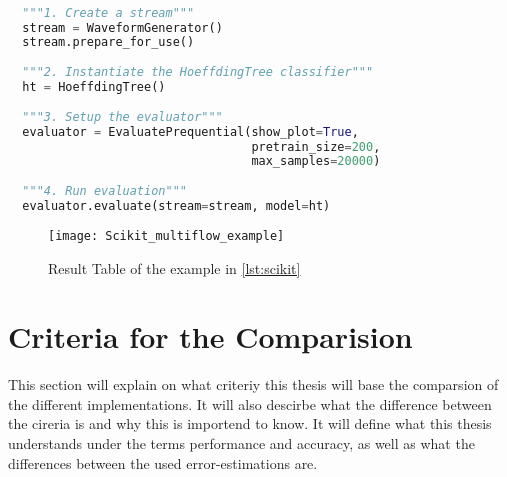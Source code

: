 \documentclass[12pt,oneside,a4paper,parskip]{scrbook}
\begin{document}
\begin{lstlisting}[label=lst:scikit,
  language=python,
  firstnumber=1,
  caption=Simple example of the scikit-multiflow workflow]			   

  """1. Create a stream""" 
  stream = WaveformGenerator()
  stream.prepare_for_use()
  
  """2. Instantiate the HoeffdingTree classifier"""
  ht = HoeffdingTree()
  
  """3. Setup the evaluator"""
  evaluator = EvaluatePrequential(show_plot=True,
                                  pretrain_size=200,
                                  max_samples=20000)
  
  """4. Run evaluation"""
  evaluator.evaluate(stream=stream, model=ht)
\end{lstlisting}

\begin{figure}[H]
  \centering
  \texttt{[image: Scikit\_multiflow\_example]}
  \caption{Result Table of the example in \ref{lst:scikit}} 
  \label{fig:sci_result_examp}
\end{figure}

\section{Criteria for the Comparision}

This section will explain on what criteriy this thesis will base the comparsion of the different implementations. 
It will also descirbe what the difference between the cireria is and why this is importend to know.
It will define what this thesis understands under the terms performance and accuracy, as well as what the differences
between the used error-estimations are.
\end{document}
